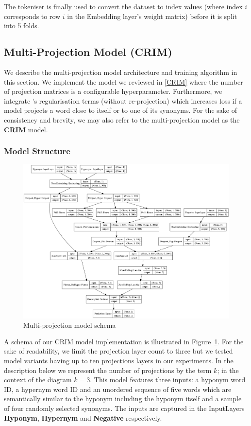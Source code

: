 The tokeniser is finally used to convert the dataset to index values (where index $i$ corresponds to row $i$ in the Embedding layer's weight matrix) before it is split into 5 folds.

\subsection{Multi-Projection Model (CRIM)} \label{multi-proj-model}
We describe the multi-projection model architecture and training algorithm in this section.  We implement the model we reviewed in \cref{CRIM} where the number of projection matrices is a configurable hyperparameter.  Furthermore, we integrate \citep{ustalov2017negative}'s regularisation terms (without re-projection) which increases loss if a model projects a word close to itself or to one of its synonyms.  For the sake of consistency and brevity, we  may also refer to the multi-projection model as the \textbf{CRIM} model.

\subsubsection{Model Structure} \label{crim_model_structure}
\begin{figure}[ht!] 
  \centering
  \includegraphics[width=1.\linewidth]{images/CRIM_multiphi_regularised.png}
  \caption{Multi-projection model schema}
  \label{fig:multiphi_model}
\end{figure}
A schema of our CRIM model implementation is illustrated in Figure~\ref{fig:multiphi_model}.  For the sake of readability, we limit the projection layer count to three but we tested model variants having up to ten projections layers in our experiments.  In the description below we represent the number of projections by the term $k$; in the context of the diagram $k=3$.  This model features three inputs: a hyponym word ID, a hypernym word ID and an unordered sequence of five words which are semantically similar to the hyponym including the hyponym itself and a sample of four randomly selected synonyms.  The inputs are captured in the InputLayers \textbf{Hyponym}, \textbf{Hypernym} and \textbf{Negative} respectively.

